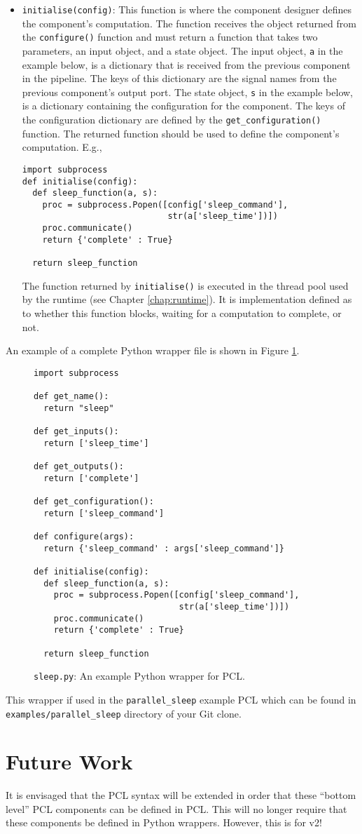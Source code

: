 \begin{itemize}
\item \texttt{initialise(config)}: This function is where the component designer defines the component's computation. The function receives the object returned from the \texttt{configure()} function and must return a function that takes two parameters, an input object, and a state object. The input object, \texttt{a} in the example below, is a dictionary that is received from the previous component in the pipeline. The keys of this dictionary are the signal names from the previous component's output port. The state object, \texttt{s} in the example below, is a dictionary containing the configuration for the component. The keys of the configuration dictionary are defined by the \texttt{get\_configuration()} function. The returned function should be used to define the component's computation. E.g.,
\begin{verbatim}
import subprocess
def initialise(config):
  def sleep_function(a, s):
    proc = subprocess.Popen([config['sleep_command'],
                             str(a['sleep_time'])])
    proc.communicate()
    return {'complete' : True}

  return sleep_function
\end{verbatim}
The function returned by \texttt{initialise()} is executed in the thread pool used by the runtime (see Chapter \ref{chap:runtime}). It is implementation defined as to whether this function blocks, waiting for a computation to complete, or not.
\end{itemize}

An example of a complete Python wrapper file is shown in Figure \ref{fig:python-wrapper}.
\begin{figure}[h!]
\begin{verbatim}
import subprocess

def get_name():
  return "sleep"

def get_inputs():
  return ['sleep_time']

def get_outputs():
  return ['complete']

def get_configuration():
  return ['sleep_command']

def configure(args):
  return {'sleep_command' : args['sleep_command']}

def initialise(config):
  def sleep_function(a, s):
    proc = subprocess.Popen([config['sleep_command'],
                             str(a['sleep_time'])])
    proc.communicate()
    return {'complete' : True}

  return sleep_function
\end{verbatim}
\caption{\texttt{sleep.py}: An example Python wrapper for PCL.}
\label{fig:python-wrapper}
\end{figure}
This wrapper if used in the \texttt{parallel\_sleep} example PCL which can be found in \texttt{examples/parallel\_sleep} directory of your Git clone.

\section{Future Work}
It is envisaged that the PCL syntax will be extended in order that these ``bottom level'' PCL components can be defined in PCL. This will no longer require that these components be defined in Python wrappers. However, this is for v2!
